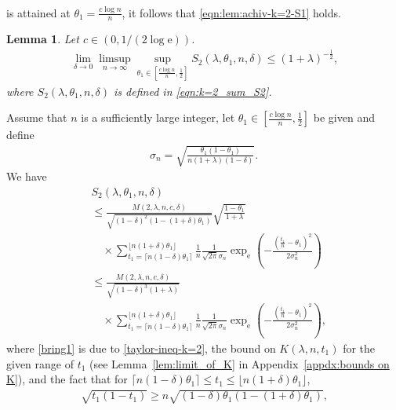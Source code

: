 \documentclass[journal, 10pt]{IEEEtran}
\newcommand{\rme}{\mathrm{e}}
\theoremstyle{plain}
\theoremstyle{plain}
\newtheorem{lem}{Lemma}%
\theoremstyle{plain}
\theoremstyle{plain}
\begin{document}
\begin{appendices}
\begin{IEEEproof}
\begin{align*}
\end{align*}
is attained at $\theta_1=\frac{c\log n}{n} $, it follows that \eqref{eqn:lem:achiv-k=2-S1} holds.
\end{IEEEproof}
%
\begin{lem}\label{lem:k=2_sum_S2_asympt}
Let $c \in (0, 1/(2\log \rme))$.
\begin{align}
\lim_{\delta\to 0} \limsup_{n \to \infty} \sup_{\theta_1\in \left[ \frac{c\log n}{n}, \frac{1}{2} \right]} S_2(\lambda, \theta_1, n, \delta) \le (1+\lambda)^{-\frac{1}{2}}\text{,} \label{eqn:lem:k=2-S2}
\end{align}
where $ S_2(\lambda, \theta_1, n, \delta)$ is defined in \eqref{eqn:k=2_sum_S2}.
\end{lem}
\begin{IEEEproof}
Assume that $n$ is a sufficiently large integer, let $\theta_1 \in \left[ \frac{c\log n}{n} , \frac{1}{2} \right] $ be given and define
\begin{align}
	\sigma_n=\sqrt{\frac{\theta_1(1-\theta_1) }{n(1+\lambda)(1-\delta)} }\text{.}
\end{align} 
We have
\begin{align}
&S_2(\lambda, \theta_1, n, \delta) \nonumber \\  
&\le \frac{M(2, \lambda, n, c, \delta) }{\sqrt{(1-\delta)^2 (1-(1+\delta)\theta_1) } } \sqrt{\frac{1-\theta_1 }{1+\lambda}}\label{bring1} \\ 
&\quad \times \sum_{t_1=\lceil n(1-\delta)\theta_1 \rceil }^{\lfloor n(1+\delta)\theta_1 \rfloor} \frac{1}{n} \frac{1}{\sqrt{ 2\pi} \sigma_n } \exp_\rme\left(-\frac{\left(\frac{t_1}{n}-\theta_1\right)^2}{2\sigma_n^2}\right)  \nonumber \\
&\le \frac{M(2, \lambda, n, c, \delta)}{\sqrt{(1-\delta)^3 (1+\lambda) } }  \label{bring2}\\ 
&\quad \times  \sum_{t_1=\lceil n(1-\delta)\theta_1 \rceil }^{\lfloor n(1+\delta)\theta_1 \rfloor} \frac{1}{n} \frac{1}{\sqrt{ 2\pi} \sigma_n } \exp_\rme\left(-\frac{\left(\frac{t_1}{n}-\theta_1\right)^2}{2\sigma_n^2}\right)\text{,}  \nonumber
\end{align}
where \eqref{bring1} is due to \eqref{taylor-ineq-k=2}, the bound on $K(\lambda, n, t_1) $ for the given range of $t_1$ (see Lemma~\ref{lem:limit_of_K} in Appendix~\ref{appdx:bounds on K}), and the fact that for $\lceil n(1-\delta)\theta_1 \rceil \le t_1 \le \lfloor n(1+\delta)\theta_1 \rfloor $,
\begin{align}
\sqrt{t_1 \left(1-t_1 \right)} \ge n\sqrt{(1-\delta)\theta_1(1-(1+\delta)\theta_1)}\text{,}

\end{align}
\end{IEEEproof}
\end{appendices}
\end{document}
